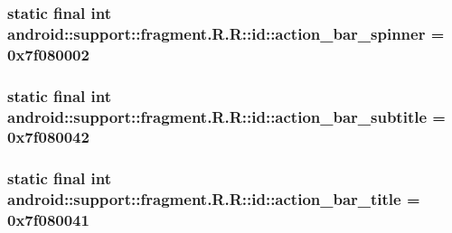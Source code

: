 \hypertarget{classandroid_1_1support_1_1fragment_1_1_r_1_1id_a46d8f268ebc80739b4594be07a2e886}{
\subsubsection[{action\_\-bar\_\-spinner}]{\setlength{\rightskip}{0pt plus 5cm}static final int android::support::fragment.R.R::id::action\_\-bar\_\-spinner = 0x7f080002}}
\label{classandroid_1_1support_1_1fragment_1_1_r_1_1id_a46d8f268ebc80739b4594be07a2e886}


\hypertarget{classandroid_1_1support_1_1fragment_1_1_r_1_1id_ca9bd6b2ce696a1d0d55f945785fe560}{
\subsubsection[{action\_\-bar\_\-subtitle}]{\setlength{\rightskip}{0pt plus 5cm}static final int android::support::fragment.R.R::id::action\_\-bar\_\-subtitle = 0x7f080042}}
\label{classandroid_1_1support_1_1fragment_1_1_r_1_1id_ca9bd6b2ce696a1d0d55f945785fe560}


\hypertarget{classandroid_1_1support_1_1fragment_1_1_r_1_1id_79bfcd6ccb650d1ebb39b4656a8302f4}{
\subsubsection[{action\_\-bar\_\-title}]{\setlength{\rightskip}{0pt plus 5cm}static final int android::support::fragment.R.R::id::action\_\-bar\_\-title = 0x7f080041}}
\label{classandroid_1_1support_1_1fragment_1_1_r_1_1id_79bfcd6ccb650d1ebb39b4656a8302f4}


